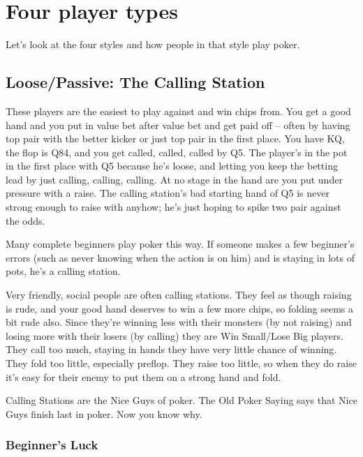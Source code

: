 
\section{Four player types}

Let's look at the four styles and how people in that style play poker.

\subsection{Loose/Passive: The Calling Station}

These players are the easiest to play against and win chips from.
You get a good hand and you put in value bet after value bet and
get paid off -- often by having top pair with the better kicker or
just top pair in the first place. You have KQ, the flop is Q84, and
you get called, called, called by Q5. The player's in the pot in the
first place with Q5 because he's loose, and letting you keep the
betting lead by just calling, calling, calling. At no stage in
the hand are you put under pressure with a raise. The calling
station's bad starting hand of Q5 is never strong enough to raise with
anyhow; he's just hoping to spike two pair against the odds.

Many complete beginners play poker this way. If someone makes
a few beginner's errors (such as never knowing when the action
is on him) and is staying in lots of pots, he's a calling station.

Very friendly, social people are often calling stations.
They feel as though raising is rude, and your good hand deserves
to win a few more chips, so folding seems a bit rude also. Since
they're winning less with their monsters (by not raising)
and losing more with their losers (by calling) they are
Win Small/Lose Big players. They call too much, staying
in hands they have very little chance of winning. They fold
too little, especially preflop. They raise too little, so when
they do raise it's easy for their enemy to put them on a strong hand
and fold.

Calling Stations are the Nice Guys of poker. The Old Poker Saying says
that Nice Guys finish last in poker. Now you know why.

\subsubsection{Beginner's Luck}

